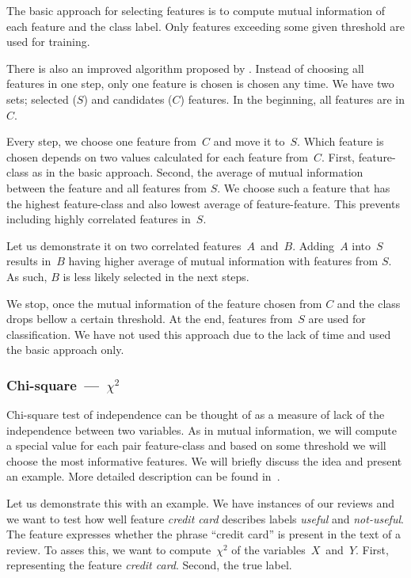 The basic approach for selecting features is
to compute mutual information of each feature and the class label.
Only features exceeding some given threshold are used for training.

There is also an improved algorithm proposed by \citet{Hoq14}.
Instead of choosing all features in one step,
only one feature is chosen is chosen any time.
We have two sets; selected ($S$) and candidates ($C$) features.
In the beginning, all features are in $C$.

Every step, we choose one feature from~$C$ and move it to~$S$.
Which feature is chosen depends on two values calculated for each feature from~$C$.
First, feature-class as in the basic approach.
Second, the average of mutual information between the feature and all features from $S$.
We choose such a feature that has the highest feature-class and also lowest average of feature-feature.
This prevents including highly correlated features in~$S$.

Let us demonstrate it on two correlated features~$A$~and~$B$.
Adding~$A$ into~$S$ results in~$B$ having higher average of mutual information with features from $S$.
As such, $B$ is less likely selected in the next steps.

We stop, once the mutual information of the feature chosen from $C$ and the class drops bellow a certain
threshold.
At the end, features from~$S$ are used for classification.
We have not used this approach due to the lack of time and used the basic approach only.


\subsubsection{Chi-square~---~$\chi^2$}

Chi-square test of independence can be thought of
as a measure of lack of the independence between two variables.
As in mutual information,
we will compute a special value for each pair feature-class
and based on some threshold we will choose the most informative features.
We will briefly discuss the idea and present an example.
More detailed description can be found in~\citet{Hugh13}.


Let us demonstrate this with an example.
We have instances of our reviews and we want to test how well
feature \textit{credit card} describes
labels \textit{useful} and \textit{not-useful}.
The feature expresses whether the phrase ``credit card'' is present in the text of a review.
To asses this, we want to compute~$\chi^2$ of the variables~$X$~and~$Y$.
First, representing the feature \textit{credit card}.
Second, the true label.

